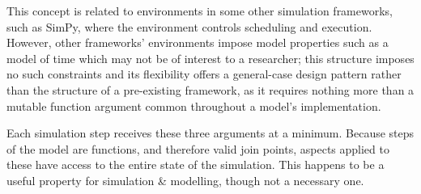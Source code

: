 \begin{description}
    This concept is related to
    environments in some other simulation frameworks, such as
    SimPy\cite{simpy_documentation}, where the environment controls scheduling
    and execution. However, other frameworks' environments impose model
    properties such as a model of time which may not be of interest to a
    researcher; this structure imposes no such constraints and its flexibility
    offers a general-case design pattern rather than the structure of a
    pre-existing framework, as it requires nothing more than a mutable
    function argument common throughout a model's implementation.
\end{description}

Each simulation step receives these three arguments at a minimum. Because steps
of the model are functions, and therefore valid join points, aspects applied to
these have access to the entire state of the simulation. This happens to be a
useful property for \aspectoriented{} simulation \& modelling, though not a
necessary one.